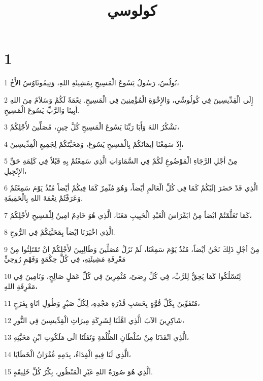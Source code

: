 

\title{كولوسي}


\chapter{1}

\par 1 بُولُسُ، رَسُولُ يَسُوعَ الْمَسِيحِ بِمَشِيئَةِ اللهِ، وَتِيمُوثَاوُسُ الأَخُ،
\par 2 إِلَى الْقِدِّيسِينَ فِي كُولُوسِّي، وَالإِخْوَةِ الْمُؤْمِنِينَ فِي الْمَسِيحِ. نِعْمَةٌ لَكُمْ وَسَلاَمٌ مِنَ اللهِ أبِينَا وَالرَّبِّ يَسُوعَ الْمَسِيحِ.
\par 3 نَشْكُرُ اللهَ وَأَبَا رَبِّنَا يَسُوعَ الْمَسِيحِ كُلَّ حِينٍ، مُصَلِّينَ لأَجْلِكُمْ،
\par 4 إِذْ سَمِعْنَا إيمَانَكُمْ بِالْمَسِيحِ يَسُوعَ، وَمَحَبَّتَكُمْ لِجَمِيعِ الْقِدِّيسِينَ،
\par 5 مِنْ أجْلِ الرَّجَاءِ الْمَوْضُوعِ لَكُمْ فِي السَّمَاوَاتِ الَّذِي سَمِعْتُمْ بِهِ قَبْلاً فِي كَلِمَةِ حَقِّ الإِنْجِيلِ،
\par 6 الَّذِي قَدْ حَضَرَ إلَيْكُمْ كَمَا فِي كُلِّ الْعَالَمِ أيْضاً، وَهُوَ مُثْمِرٌ كَمَا فِيكُمْ أيْضاً مُنْذُ يَوْمَ سَمِعْتُمْ وَعَرَفْتُمْ نِعْمَةَ اللهِ بِالْحَقِيقَةِ.
\par 7 كَمَا تَعَلَّمْتُمْ ايْضاً مِنْ ابَفْرَاسَ الْعَبْدِ الْحَبِيبِ مَعَنَا، الَّذِي هُوَ خَادِمٌ امِينٌ لِلْمَسِيحِ لأَجْلِكُمُ،
\par 8 الَّذِي اخْبَرَنَا ايْضاً بِمَحَبَّتِكُمْ فِي الرُّوحِ.
\par 9 مِنْ أجْلِ ذَلِكَ نَحْنُ أيْضاً، مُنْذُ يَوْمَ سَمِعْنَا، لَمْ نَزَلْ مُصَلِّينَ وَطَالِبِينَ لأَجْلِكُمْ انْ تَمْتَلِئُوا مِنْ مَعْرِفَةِ مَشِيئَتِهِ، فِي كُلِّ حِكْمَةٍ وَفَهْمٍ رُوحِيٍّ
\par 10 لِتَسْلُكُوا كَمَا يَحِقُّ لِلرَّبِّ، فِي كُلِّ رِضىً، مُثْمِرِينَ فِي كُلِّ عَمَلٍ صَالِحٍ، وَنَامِينَ فِي مَعْرِفَةِ اللهِ،
\par 11 مُتَقَوِّينَ بِكُلِّ قُوَّةٍ بِحَسَبِ قُدْرَةِ مَجْدِهِ، لِكُلِّ صَبْرٍ وَطُولِ انَاةٍ بِفَرَحٍ،
\par 12 شَاكِرِينَ الآبَ الَّذِي اهَّلَنَا لِشَرِكَةِ مِيرَاثِ الْقِدِّيسِينَ فِي النُّورِ،
\par 13 الَّذِي انْقَذَنَا مِنْ سُلْطَانِ الظُّلْمَةِ وَنَقَلَنَا الَى مَلَكُوتِ ابْنِ مَحَبَّتِهِ،
\par 14 الَّذِي لَنَا فِيهِ الْفِدَاءُ، بِدَمِهِ غُفْرَانُ الْخَطَايَا،
\par 15 اَلَّذِي هُوَ صُورَةُ اللهِ غَيْرِ الْمَنْظُورِ، بِكْرُ كُلِّ خَلِيقَةٍ.
